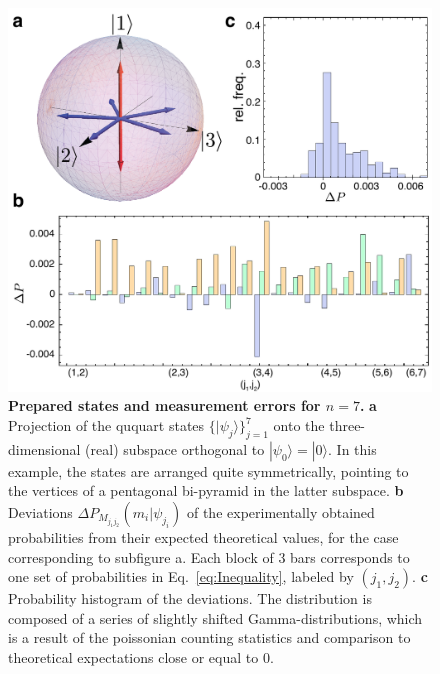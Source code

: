 \documentclass[aps,prl,floatfix,twocolumn,tightenlines,amsmath,amssymb,nofootinbib]{revtex4-1}
\newcommand{\ket}[1] {| #1 \rangle}
\begin{document}
\begin{figure}[ht!]
\begin{center}
\includegraphics[width=\columnwidth]{Figure_4.pdf}
\end{center}
\vspace{-1.5em}
\caption{\textbf{Prepared states and measurement errors for $n=7$.} \textbf{a} Projection of the ququart states $\{\ket{\psi_j}\}_{j=1}^7$ onto the three-dimensional (real) subspace orthogonal to $\ket{\psi_0}=\ket{0}$. In this example, the states are arranged quite symmetrically, pointing to the vertices of a pentagonal bi-pyramid in the latter subspace. \textbf{b} Deviations $\Delta P_{M_{j_1j_2}}(m_i | \psi_{j_i})$ of the experimentally obtained probabilities from their expected theoretical values, for the case corresponding to subfigure a. Each block of $3$ bars corresponds to one set of probabilities in Eq.~\eqref{eq:Inequality}, labeled by $(j_1,j_2)$. \textbf{c} Probability histogram of the deviations. The distribution is composed of a series of slightly shifted Gamma-distributions, which is a result of the poissonian counting statistics and comparison to theoretical expectations close or equal to $0$.}
  \label{fig:errors}
\end{figure}
\end{document}
